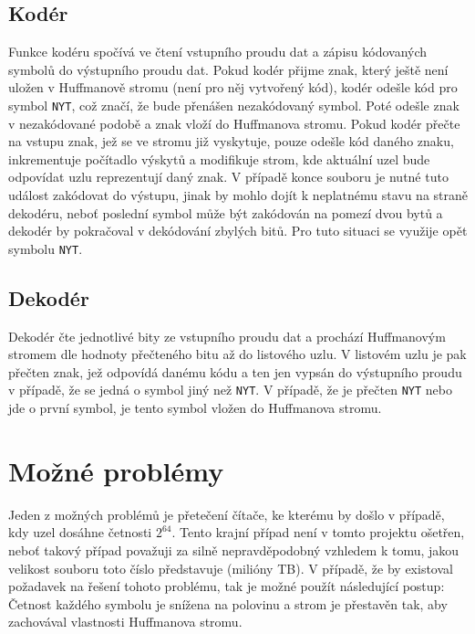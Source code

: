 \documentclass[12pt,a4paper,titlepage,final]{article}
\begin{document}
	\subsection{Kodér}
	Funkce kodéru spočívá ve čtení vstupního proudu dat a zápisu kódovaných symbolů do výstupního proudu dat.
	Pokud kodér přijme znak, který ještě není uložen v Huffmanově stromu (není pro něj vytvořený kód),
	kodér odešle kód pro symbol \texttt{NYT}, což značí, že bude přenášen nezakódovaný symbol.
	Poté odešle znak v nezakódované podobě a znak vloží do Huffmanova stromu.
	Pokud kodér přečte na vstupu znak, jež se ve stromu již vyskytuje, pouze odešle kód daného znaku, inkrementuje počítadlo
	výskytů a modifikuje strom, kde aktuální uzel bude odpovídat uzlu reprezentují daný znak.
	V případě konce souboru je nutné tuto událost zakódovat do výstupu, jinak by mohlo dojít k neplatnému stavu na 
	straně dekodéru, neboť poslední symbol může být zakódován na pomezí dvou bytů a dekodér by pokračoval v dekódování zbylých bitů.
	Pro tuto situaci se využije opět symbolu \texttt{NYT}.

	\subsection{Dekodér}
	Dekodér čte jednotlivé bity ze vstupního proudu dat a prochází Huffmanovým stromem dle hodnoty přečteného bitu až do listového uzlu.
	V listovém uzlu je pak přečten znak, jež odpovídá danému kódu a ten jen vypsán do výstupního proudu 
	v případě, že se jedná o symbol jiný než \texttt{NYT}. 
	V případě, že je přečten \texttt{NYT} nebo jde o první symbol, je tento symbol vložen do Huffmanova stromu.

\section{Možné problémy}
Jeden z možných problémů je přetečení čítače, ke kterému by došlo v případě, kdy uzel dosáhne četnosti $2^{64}$.
Tento krajní případ není v tomto projektu ošetřen, neboť takový případ považuji za silně nepravděpodobný vzhledem k tomu,
jakou velikost souboru toto číslo představuje (milióny TB). V případě, že by existoval požadavek na řešení tohoto problému,
tak je možné použít následující postup: Četnost každého symbolu je snížena na polovinu a strom je přestavěn tak, aby
zachovával vlastnosti Huffmanova stromu.
\end{document}
